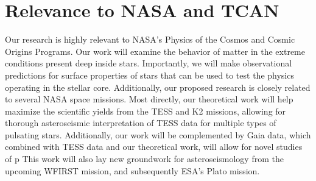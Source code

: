 {\color{orange}

\section{Relevance to NASA and TCAN}



Our research is highly relevant to NASA's Physics of the Cosmos and Cosmic Origins Programs. Our work will examine the behavior of matter in the extreme conditions present deep inside stars. Importantly, we will make observational predictions for surface properties of stars that can be used to test the physics operating in the stellar core. Additionally, our proposed research is closely related to several NASA space missions. Most directly, our theoretical work will help maximize the scientific yields from the TESS and K2 missions, allowing for thorough asteroseismic interpretation of TESS data for multiple types of pulsating stars. Additionally, our work will be complemented by Gaia data, which combined with TESS data and our theoretical work, will allow for novel studies of p This work will also lay new groundwork for asteroseismology from the upcoming WFIRST mission, and subsequently ESA's Plato mission. 


}